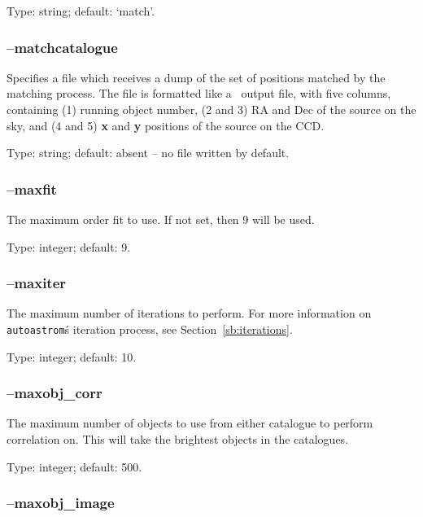 \documentclass[twoside,11pt,nolof]{starlink}
\providecommand{\autoastrom}{\texttt{autoastrom}}
\providecommand{\SExtractor}{\xref{{\footnotesize SExtractor}}{sun226}}
\begin{document}
Type: string; default: `match'.

\subsubsection{--matchcatalogue\label{sb:options:matchcatalogue}}

Specifies a file which receives a dump of the set of positions matched by the
matching process.  The file is formatted like a \SExtractor\ output file, with
five columns, containing (1) running object number, (2 and 3) RA and Dec of
the source on the sky, and (4 and 5) \textbf{x} and \textbf{y} positions of
the source on the CCD.

Type: string; default: absent -- no file written by default.

\subsubsection{--maxfit\label{sb:options:maxfit}}

The maximum order fit to use. If not set, then 9 will be used.

Type: integer; default: 9.

\subsubsection{--maxiter\label{sb:options:maxiter}}

The maximum number of iterations to perform. For more information on
\autoastrom\'s iteration process, see Section~\ref{sb:iterations}.

Type: integer; default: 10.

\subsubsection{--maxobj\_corr\label{sb:options:maxobj_corr}}

The maximum number of objects to use from either catalogue to perform
correlation on. This will take the brightest objects in the catalogues.

Type: integer; default: 500.

\subsubsection{--maxobj\_image\label{sb:options:maxobj_image}}
\end{document}
